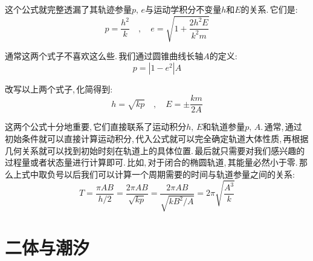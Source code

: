 这个公式就完整透漏了其轨迹参量$p,\,e$与运动学积分不变量$h$和$E$的关系.\,它们是:
\[p=\frac{h^2}{k}\quad ,\quad e=\sqrt{1+\frac{2h^2E}{k^2m}}\]

通常这两个式子不喜欢这么些.\,我们通过圆锥曲线长轴$A$的定义:
\[p=|1-e^2|A\]

改写以上两个式子,\,化简得到:
\[h=\sqrt{kp}\quad ,\quad E=\pm \frac{km}{2A}\]

这两个公式十分地重要,\,它们直接联系了运动积分$h,\,E$和轨道参量$p,\,A$.\,通常,\,通过初始条件就可以直接计算运动积分,\,代入公式就可以完全确定轨道大体性质,\,再根据几何关系就可以找到初始时刻在轨道上的具体位置.\,最后就只需要对我们感兴趣的过程量或者状态量进行计算即可.\,比如,\,对于闭合的椭圆轨道,\,其能量必然小于零.\,那么上式中取负号以后我们可以计算一个周期需要的时间与轨道参量之间的关系:
\[T=\frac{\pi AB}{h/2}=\frac{2\pi AB}{\sqrt{kp}}=\frac{2\pi AB}{\sqrt{kB^2/A}}=2\pi\sqrt{\frac{A^3}{k}}\]



\section{二体与潮汐}

